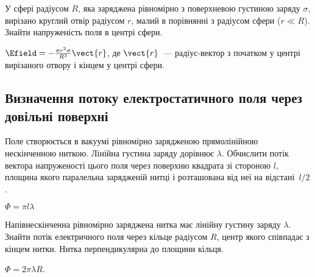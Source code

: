 \begin{problem}
У сфері радіусом $R$, яка заряджена рівномірно з поверхневою густиною заряду $\sigma$, вирізано круглий отвір радіусом $r$, малий в порівнянні з радіусом сфери ($r \ll R$). Знайти напруженість поля в центрі сфери.
\begin{solution}
	$\Efield =-\frac{\pi r^2 \sigma}{R^3}\vect{r}$, де $\vect{r}$~--- радіус-вектор з початком у центрі вирізаного отвору і кінцем у центрі сфери.
\end{solution}
\end{problem}


\subsection*{Визначення потоку електростатичного поля через довільні поверхні}

\begin{problem}
Поле створюється в вакуумі рівномірно зарядженою прямолінійною нескінченною ниткою. Лінійна густина заряду дорівнює $\lambda$. Обчислити потік вектора напруженості цього поля через поверхню квадрата зі стороною $l$, площина якого паралельна зарядженій нитці і розташована від неї на відстані~$l/2$.
\begin{solution}
	$\Phi = \pi l \lambda$
\end{solution}
\end{problem}

\begin{problem}
Напівнескінченна рівномірно заряджена нитка має лінійну густину заряду $\lambda$. Знайти потік електричного поля через кільце радіусом $R$, центр якого співпадає з кінцем нитки. Нитка перпендикулярна до площини кільця.
\begin{solution}
	$\Phi = 2\pi\lambda R$.
\end{solution}
\end{problem}

